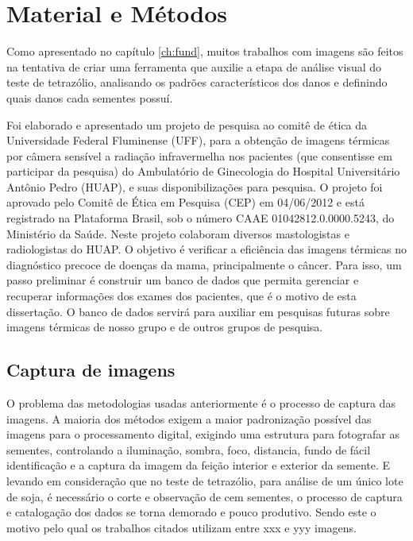 


\chapter{Material e Métodos} \label{ch:meto}

Como apresentado no capítulo \ref{ch:fund}, muitos trabalhos com imagens são feitos na tentativa de criar uma ferramenta que auxilie a etapa de análise visual do teste de tetrazólio, analisando os padrões característicos dos danos e definindo quais danos cada sementes possuí.


Foi elaborado e apresentado um projeto de pesquisa ao comitê de ética da Universidade Federal Fluminense (UFF), para a obtenção de imagens térmicas por câmera sensível a radiação infravermelha nos pacientes (que consentisse em participar da pesquisa) do Ambulatório de Ginecologia do Hospital Universitário Antônio Pedro (HUAP), e suas disponibilizações para pesquisa. O projeto foi aprovado pelo Comitê de Ética em Pesquisa (CEP) em 04/06/2012 e está registrado na Plataforma Brasil, sob o número CAAE 01042812.0.0000.5243, do Ministério da Saúde. Neste projeto colaboram diversos mastologistas e radiologistas do HUAP. O objetivo é verificar a eficiência das imagens térmicas no diagnóstico precoce de doenças da mama, principalmente o câncer. Para isso, um passo preliminar é construir um banco de dados que permita gerenciar e recuperar informações dos exames dos pacientes, que é o motivo de esta dissertação. O banco de dados servirá para auxiliar em pesquisas futuras sobre imagens térmicas de nosso grupo e de outros grupos de pesquisa.



\section{Captura de imagens}

O problema das metodologias usadas anteriormente é o processo de captura das imagens. A maioria dos métodos exigem a maior padronização possível das imagens para o processamento digital, exigindo uma estrutura para fotografar as sementes, controlando a iluminação, sombra, foco, distancia, fundo de fácil identificação e a captura da imagem da feição interior e exterior da semente. E levando em consideração que no teste de tetrazólio, para análise de um único lote de soja, é necessário o corte e observação de cem sementes, o processo de captura e catalogação dos dados se torna demorado e pouco produtivo. Sendo este o motivo pelo qual os trabalhos citados utilizam entre xxx e yyy imagens.

